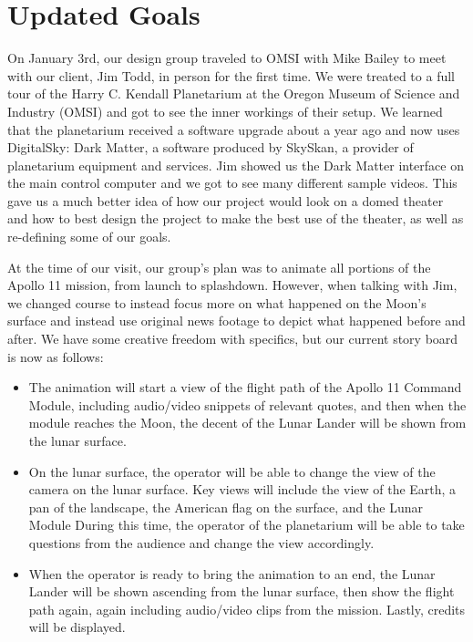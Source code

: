 \documentclass[onecolumn, draftclsnofoot,10pt, compsoc]{IEEEtran}
\begin{document}
\clearpage


\section{Updated Goals}


On January 3rd, our design group traveled to OMSI with Mike Bailey to meet with our client, Jim Todd, in person for the first time. We were treated to a full tour of the Harry C. Kendall Planetarium at the Oregon Museum of Science and Industry (OMSI) and got to see the inner workings of their setup. We learned that the planetarium received a software upgrade about a year ago and now uses DigitalSky: Dark Matter, a software produced by SkySkan, a provider of planetarium equipment and services. Jim showed us the Dark Matter interface on the main control computer and we got to see many different sample videos. This gave us a much better idea of how our project would look on a domed theater and how to best design the project to make the best use of the theater, as well as re-defining some of our goals. 

At the time of our visit, our group's plan was to animate all portions of the Apollo 11 mission, from launch to splashdown. However, when talking with Jim, we changed course to instead focus more on what happened on the Moon's surface and instead use original news footage to depict what happened before and after. We have some creative freedom with specifics, but our current story board is now as follows: 

\begin{itemize}
    \item The animation will start a view of the flight path of the Apollo 11 Command Module, including audio/video snippets of relevant quotes, and then when the module reaches the Moon, the decent of the Lunar Lander will be shown from the lunar surface.
    
    \item On the lunar surface, the operator will be able to change the view of the camera on the lunar surface. Key views will include the view of the Earth, a pan of the landscape, the American flag on the surface, and the Lunar Module During this time, the operator of the planetarium will be able to take questions from the audience and change the view accordingly. 
    
    \item When the operator is ready to bring the animation to an end, the Lunar Lander will be shown ascending from the lunar surface, then show the flight path again, again including audio/video clips from the mission. Lastly, credits will be displayed. 
    
\end{itemize}
\end{document}
